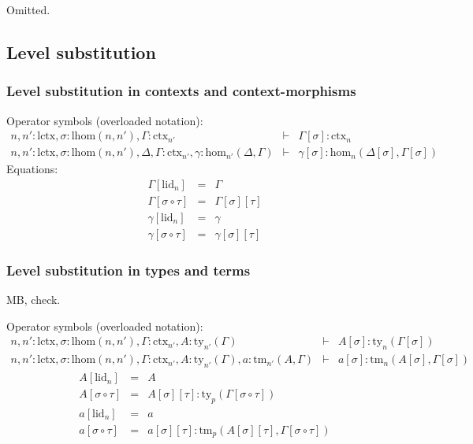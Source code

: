 \documentclass[11pt,a4paper]{article}
\theoremstyle{definition}
\def\lhom{\mathrm{lhom}}
\def\Hom{\mathrm{hom}}
\def\lctx{\mathrm{lctx}}
\def\lid{\mathrm{lid}}
\newcommand{\ctx}{\mathrm{ctx}}
\newcommand{\ty}{\mathrm{ty}}
\newcommand{\tm}{\mathrm{tm}}
\begin{document}
Omitted.

\subsection{Level substitution}

\subsubsection{Level substitution in contexts and context-morphisms}

Operator symbols (overloaded notation):
\begin{eqnarray*}
n, n' : \lctx , \sigma : \lhom(n,n'), \Gamma : \ctx_{n'} &\vdash& 
\Gamma[\sigma] : \ctx_n\\
n, n' : \lctx , \sigma : \lhom(n,n'), \Delta,\Gamma : \ctx_{n'}, \gamma : \Hom_{n'}(\Delta,\Gamma) 
&\vdash& 
\gamma[\sigma] : \Hom_{n}(\Delta[\sigma],\Gamma[\sigma]) 
\end{eqnarray*}
Equations:
\begin{eqnarray*}
\Gamma[\lid_n] &=& \Gamma\\
\Gamma[\sigma \circ \tau] &=& \Gamma[\sigma][\tau]\\
\gamma[\lid_n] &=& \gamma\\
\gamma[\sigma \circ \tau] &=& \gamma[\sigma][\tau]
\end{eqnarray*}

\subsubsection{Level substitution in types and terms}

MB, check.

Operator symbols (overloaded notation):
\begin{eqnarray*}
n, n' : \lctx , \sigma : \lhom(n,n'), \Gamma : \ctx_{n'}, A:\ty_{n'}(\Gamma)
&\vdash& 
A[\sigma]: \ty_n(\Gamma[\sigma])\\
n,n' : \lctx , \sigma : \lhom(n,n'), \Gamma : \ctx_{n'}, A:\ty_{n'}(\Gamma), a : \tm_{n'}(A,\Gamma) 
&\vdash& 
a[\sigma] : \tm_{n}(A[\sigma],\Gamma[\sigma]) 
\end{eqnarray*}
\begin{eqnarray*}
A[\lid_n] &=& A\\
A[\sigma \circ \tau] &=& A[\sigma][\tau]: \ty_p(\Gamma[\sigma \circ \tau])\\
a[\lid_n] &=& a\\
a[\sigma \circ \tau] &=& a[\sigma][\tau]: \tm_p(A[\sigma][\tau],\Gamma[\sigma \circ \tau])
\end{eqnarray*}
\end{document}
